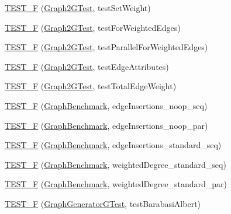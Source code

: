 \begin{DoxyCompactItemize}
\item 
\hyperlink{namespace_ensemble_clustering_a899ff25548738e0fcc0e8ebbc9afd9c1}{T\-E\-S\-T\-\_\-\-F} (\hyperlink{class_ensemble_clustering_1_1_graph2_g_test}{Graph2\-G\-Test}, test\-Set\-Weight)
\item 
\hyperlink{namespace_ensemble_clustering_a271720c278e32ce7896370e12a2a2cb3}{T\-E\-S\-T\-\_\-\-F} (\hyperlink{class_ensemble_clustering_1_1_graph2_g_test}{Graph2\-G\-Test}, test\-For\-Weighted\-Edges)
\item 
\hyperlink{namespace_ensemble_clustering_a8f9cb2a2e488d5b43857458380c2a6cf}{T\-E\-S\-T\-\_\-\-F} (\hyperlink{class_ensemble_clustering_1_1_graph2_g_test}{Graph2\-G\-Test}, test\-Parallel\-For\-Weighted\-Edges)
\item 
\hyperlink{namespace_ensemble_clustering_a5bf1e2db6f07a09add0ca4d8bd1b0f25}{T\-E\-S\-T\-\_\-\-F} (\hyperlink{class_ensemble_clustering_1_1_graph2_g_test}{Graph2\-G\-Test}, test\-Edge\-Attributes)
\item 
\hyperlink{namespace_ensemble_clustering_a101cb243e7cc0bd7b23b2f8fbc961402}{T\-E\-S\-T\-\_\-\-F} (\hyperlink{class_ensemble_clustering_1_1_graph2_g_test}{Graph2\-G\-Test}, test\-Total\-Edge\-Weight)
\item 
\hyperlink{namespace_ensemble_clustering_afb66e8b03d5815ebd668c5f1d531f26a}{T\-E\-S\-T\-\_\-\-F} (\hyperlink{class_ensemble_clustering_1_1_graph_benchmark}{Graph\-Benchmark}, edge\-Insertions\-\_\-noop\-\_\-seq)
\item 
\hyperlink{namespace_ensemble_clustering_a40ebd1f69ff9a40f7565f36bdf9a55ad}{T\-E\-S\-T\-\_\-\-F} (\hyperlink{class_ensemble_clustering_1_1_graph_benchmark}{Graph\-Benchmark}, edge\-Insertions\-\_\-noop\-\_\-par)
\item 
\hyperlink{namespace_ensemble_clustering_a8629d66c8020e2105a6b2eb37a9157de}{T\-E\-S\-T\-\_\-\-F} (\hyperlink{class_ensemble_clustering_1_1_graph_benchmark}{Graph\-Benchmark}, edge\-Insertions\-\_\-standard\-\_\-seq)
\item 
\hyperlink{namespace_ensemble_clustering_a712c50db173d3b94ac1070b9079b7b9a}{T\-E\-S\-T\-\_\-\-F} (\hyperlink{class_ensemble_clustering_1_1_graph_benchmark}{Graph\-Benchmark}, weighted\-Degree\-\_\-standard\-\_\-seq)
\item 
\hyperlink{namespace_ensemble_clustering_aa056282514680b9b2af2d8c89f519669}{T\-E\-S\-T\-\_\-\-F} (\hyperlink{class_ensemble_clustering_1_1_graph_benchmark}{Graph\-Benchmark}, weighted\-Degree\-\_\-standard\-\_\-par)
\item 
\hyperlink{namespace_ensemble_clustering_afa014a77f5ed1c49f4f0e52b760a9640}{T\-E\-S\-T\-\_\-\-F} (\hyperlink{class_ensemble_clustering_1_1_graph_generator_g_test}{Graph\-Generator\-G\-Test}, test\-Barabasi\-Albert)

\end{DoxyCompactItemize}

